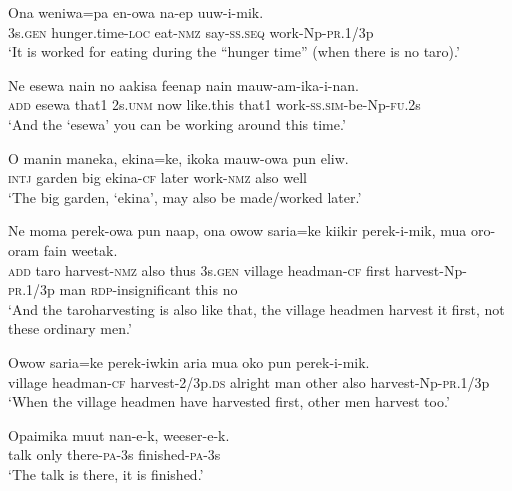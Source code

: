 \ea
\gll  Ona  weniwa=pa  en-owa  na-ep  uuw-i-mik. \\
3s.\textsc{gen}  hunger.time-\textsc{loc}  eat-\textsc{nmz}  say-\textsc{ss.seq}  work-Np-\textsc{pr}.1/3p \\
\glt ‘It is worked for eating during the “hunger time” (when there is no taro).’ \\
\z


\ea
\gll  Ne  esewa  nain  no  aakisa  feenap  nain  mauw-am-ika-i-nan. \\
\textsc{add}  esewa  that1  2s.\textsc{unm}  now  like.this  that1  work-\textsc{ss}.\textsc{sim}-be-Np-\textsc{fu}.2s \\
\glt ‘And the ‘esewa’ you can be working around this time.’ \\
\z


\ea
\gll  O  manin  maneka,  ekina=ke,  ikoka  mauw-owa  pun  eliw. \\
\textsc{intj}  garden  big  ekina-\textsc{cf}  later  work-\textsc{nmz}  also  well \\
\glt ‘The big garden, ‘ekina’, may also be made/worked later.’ \\
\z


\ea
\gll  Ne  moma  perek-owa  pun  naap,  ona  owow  saria=ke  kiikir       perek-i-mik,  mua  oro-oram  fain  weetak. \\
\textsc{add}  taro  harvest-\textsc{nmz}  also  thus  3s.\textsc{gen}  village  headman-\textsc{cf}  first   harvest-Np-\textsc{pr}.1/3p  man  \textsc{rdp}-insignificant  this  no \\


\glt ‘And the taroharvesting is also like that, the village headmen harvest it first, not these ordinary men.’ \\
\z


\ea
\gll  Owow  saria=ke  perek-iwkin  aria  mua  oko  pun  perek-i-mik. \\
village  headman-\textsc{cf}  harvest-2/3p.\textsc{ds}  alright  man  other  also  harvest-Np-\textsc{pr}.1/3p \\
\glt ‘When the village headmen have harvested first, other men harvest too.’ \\
\z


\ea
\gll  Opaimika  muut  nan-e-k,  weeser-e-k. \\
talk  only  there-\textsc{pa}-3s  finished-\textsc{pa}-3s \\
\glt ‘The talk is there, it is finished.’ \\
\z


